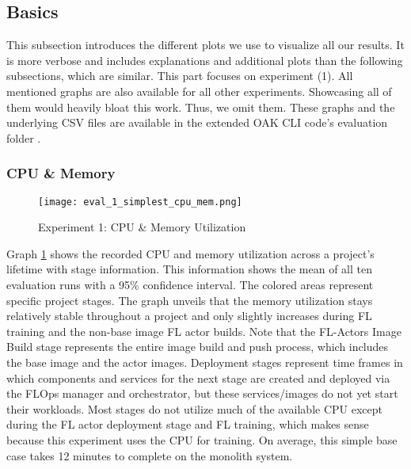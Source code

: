\subsection{Basics}

This subsection introduces the different plots we use to visualize all our results.
It is more verbose and includes explanations and additional plots than the following subsections, which are similar.
This part focuses on experiment (1).
All mentioned graphs are also available for all other experiments.
Showcasing all of them would heavily bloat this work.
Thus, we omit them.
These graphs and the underlying CSV files are available in the extended OAK CLI code's evaluation folder \cite{cli_code}.

\subsubsection{CPU \& Memory}

\begin{figure}[h]
    \begin{adjustwidth}{-0.2\paperwidth}{-0.2\paperwidth}
        \centering
        \texttt{[image: eval\_1\_simplest\_cpu\_mem.png]}
        \caption{Experiment 1: CPU \& Memory Utilization}
        \label{fig:eval_1_simplest_cpu_mem}
    \end{adjustwidth}
\end{figure}

Graph \ref{fig:eval_1_simplest_cpu_mem} shows the recorded CPU and memory utilization across a project's lifetime with stage information.
This information shows the mean of all ten evaluation runs with a 95\% confidence interval.
The colored areas represent specific project stages.
The graph unveils that the memory utilization stays relatively stable throughout a project and only slightly increases during FL training and the non-base image FL actor builds.
Note that the FL-Actors Image Build stage represents the entire image build and push process, which includes the base image and the actor images.
Deployment stages represent time frames in which components and services for the next stage are created and deployed via the FLOps manager and orchestrator, but these services/images do not yet start their workloads.
Most stages do not utilize much of the available CPU except during the FL actor deployment stage and FL training, which makes sense because this experiment uses the CPU for training.
On average, this simple base case takes 12 minutes to complete on the monolith system.


